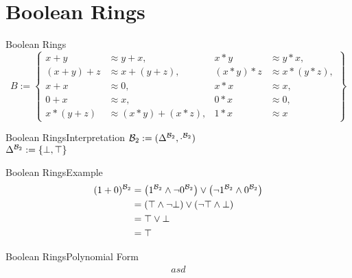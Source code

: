 \section{Boolean Rings}
\begin{frame}{Boolean Rings}
\[B:=\left\lbrace 
	\begin{aligned}
		x+y     & \approx y+x,         & x*y     & \approx y*x,     \\
		(x+y)+z & \approx x+(y+z),     & (x*y)*z & \approx x*(y*z), \\
		x+x     & \approx 0,           & x*x     & \approx x,       \\
		0+x     & \approx x,           & 0*x     & \approx 0,       \\
		x*(y+z) & \approx (x*y)+(x*z), & 1*x     & \approx x        
	\end{aligned}
	\right\rbrace \]
\end{frame}

\begin{frame}{Boolean Rings}{Interpretation}
${\mathcal{B}_2}:=(\Delta^{\mathcal{B}_2},\cdot^{\mathcal{B}_2})$\\
\vspace{10pt}\hspace{10pt}
$\Delta^{\mathcal{B}_2}:=\left\lbrace\bot,\top\right\rbrace$
\end{frame}

\begin{frame}{Boolean Rings}{Example}	
\begin{align*}
	(1+0)^{\mathcal{B}_2}&=\left( 1^{\mathcal{B}_2}\wedge\neg 0^{\mathcal{B}_2}\right) \vee \left( \neg1^{\mathcal{B}_2}\wedge 0^{\mathcal{B}_2}\right) \\
	&=\left( \top\wedge\neg\bot\right) \vee\left(\neg\top\wedge\bot \right) \\
	&=\top\vee\bot\\
	&=\top
\end{align*}
\end{frame}

\begin{frame}{Boolean Rings}{Polynomial Form}	
\begin{align*}
asd
\end{align*}
\end{frame}

